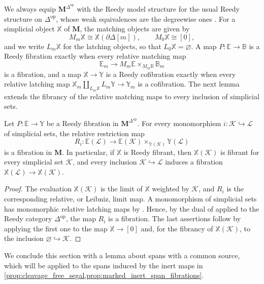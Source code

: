 \documentclass[10pt,reqno]{amsart}
\begin{document}
We always equip $\mathbf M^{\Delta^{\mathrm{op}}}$ with the Reedy
model structure for the usual Reedy structure on
$\Delta^{\mathrm{op}}$, whose weak equivalences are the degreewise
ones \cite[Theorem~15.3.4\textup{(1)} and
Example~15.3.5]{hirschhorn2003model}. For a simplicial object
$\mathbb X$ of $\mathbf M$, the matching objects are given by
\[
M_m\mathbb X\cong\mathbb X(\partial\Delta[m]),
\qquad
M_0\mathbb X\cong[0],
\]
and we write $L_m\mathbb X$ for the latching objects, so that
$L_0\mathbb X=\varnothing$. A map
$P:\mathbb E\to\mathbb B$ is a Reedy fibration exactly when every
relative matching map
\[
\mathbb E_m\longrightarrow
M_m\mathbb E\times_{M_m\mathbb B}\mathbb B_m
\]
is a fibration, and a map $\mathbb X\to\mathbb Y$ is a Reedy
cofibration exactly when every relative latching map
$\mathbb X_m\amalg_{L_m\mathbb X}L_m\mathbb Y\to\mathbb Y_m$ is a
cofibration. The next lemma extends the fibrancy of the relative
matching maps to every inclusion of simplicial sets.
\begin{lemma}
\label{lem:cellular_restriction}
Let $P:\mathbb E\to\mathbb Y$ be a Reedy fibration in
$\mathbf M^{\Delta^{\mathrm{op}}}$. For every monomorphism
$i:\mathcal K\hookrightarrow\mathcal L$ of simplicial sets,
the relative restriction map
\[
R_i:\mathbb E(\mathcal L)\longrightarrow
\mathbb E(\mathcal K)\times_{\mathbb Y(\mathcal K)}\mathbb Y(\mathcal L)
\]
is a fibration in $\mathbf M$. In particular, if $\mathbb X$
is Reedy fibrant, then $\mathbb X(\mathcal K)$ is fibrant for every
simplicial set $\mathcal K$, and every inclusion
$\mathcal K\hookrightarrow\mathcal L$ induces a fibration
$\mathbb X(\mathcal L)\to\mathbb X(\mathcal K)$.
\end{lemma}
\begin{proof}
The evaluation $\mathbb X(\mathcal K)$ is the limit of $\mathbb X$
weighted by $\mathcal K$, and $R_i$ is the corresponding relative,
or Leibniz, limit map. A monomorphism of simplicial sets has
monomorphic relative latching maps by \cite[Example~6.9]{RV14}. Hence,
by the dual of \cite[Proposition~9.1]{RV14} applied to the Reedy
category $\Delta^{\mathrm{op}}$, the map $R_i$ is a fibration. The
last assertions follow by applying the first one to the map
$\mathbb X\to[0]$ and, for the fibrancy of
$\mathbb X(\mathcal K)$, to the inclusion
$\varnothing\hookrightarrow\mathcal K$.
\end{proof}

We conclude this section with a lemma about spans with a common
source, which will be applied to the spans induced by the inert maps
in \cref{prop:cleavage_free_segal,prop:marked_inert_span_fibrations}.
\end{document}
